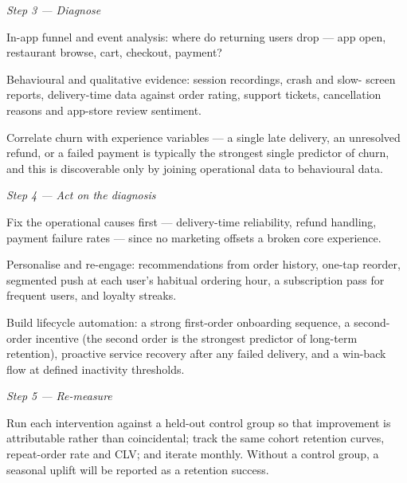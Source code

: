 \begin{qlist}
\textit{Step 3 --- Diagnose}
\begin{apts}\setcounter{enumi}{3}
\item In-app funnel and event analysis: where do returning users drop --- app
      open, restaurant browse, cart, checkout, payment?
\item Behavioural and qualitative evidence: session recordings, crash and slow-
      screen reports, delivery-time data against order rating, support tickets,
      cancellation reasons and app-store review sentiment.
\item Correlate churn with experience variables --- a single late delivery, an
      unresolved refund, or a failed payment is typically the strongest single
      predictor of churn, and this is discoverable only by joining operational
      data to behavioural data.
\end{apts}

\textit{Step 4 --- Act on the diagnosis}
\begin{apts}\setcounter{enumi}{6}
\item Fix the operational causes first --- delivery-time reliability, refund
      handling, payment failure rates --- since no marketing offsets a broken
      core experience.
\item Personalise and re-engage: recommendations from order history, one-tap
      reorder, segmented push at each user's habitual ordering hour, a
      subscription pass for frequent users, and loyalty streaks.
\item Build lifecycle automation: a strong first-order onboarding sequence, a
      second-order incentive (the second order is the strongest predictor of
      long-term retention), proactive service recovery after any failed
      delivery, and a win-back flow at defined inactivity thresholds.
\end{apts}

\textit{Step 5 --- Re-measure}
\begin{apts}\setcounter{enumi}{9}
\item Run each intervention against a held-out control group so that improvement
      is attributable rather than coincidental; track the same cohort retention
      curves, repeat-order rate and CLV; and iterate monthly. Without a control
      group, a seasonal uplift will be reported as a retention success.
\end{apts}

\end{qlist}
